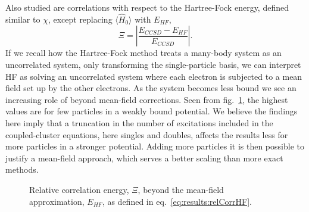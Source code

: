 Also studied are correlations with respect to the Hartree-Fock energy, defined similar to $\chi$, except replacing $\langle \hat{H}_0 \rangle$ with $E_{HF}$,
\begin{equation}
\label{eq:results:relCorrHF}
\Xi = \left| \frac{E_{CCSD} - E_{HF} }{E_{CCSD}} \right| .
\end{equation}
If we recall how the Hartree-Fock method treats a many-body system as an uncorrelated system, only transforming the single-particle basis, we can interpret HF as solving an uncorrelated system where each electron is subjected to a mean field set up by the other electrons.
As the system becomes less bound we see an increasing role of beyond mean-field corrections.
Seen from fig.~\ref{fig:results:relCorrHF}, the highest values are for few particles in a weakly bound potential.
We believe the findings here imply that a truncation in the number of excitations included in the coupled-cluster equations, here singles and doubles, affects the results less for more particles in a stronger potential.
Adding more particles it is then possible to justify a mean-field approach, which serves a better scaling than more exact methods.
\begin{figure}
\begin{center}
\caption{Relative correlation energy, $\Xi$, beyond the mean-field approximation, $E_{HF}$, as defined in eq.~\ref{eq:results:relCorrHF}.}
\label{fig:results:relCorrHF}
\end{center}
\end{figure}


